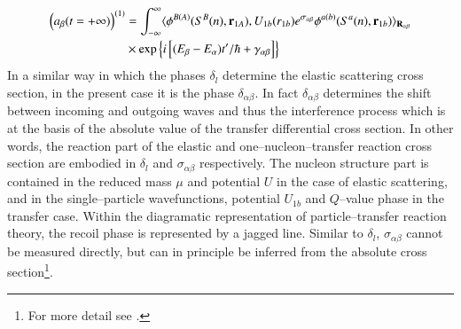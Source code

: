 \begin{subappendices}
 \begin{align}\label{eq1.D.37}
\nonumber \left(a_\beta(t=+\infty)\right)^{(1)}&=\int_{-\infty}^{\infty}\langle {\phi^{B(A)}(S^B(n),\mathbf r_{1A}),U_{1b}(r_{1b})e^{\sigma_{\alpha\beta}}\phi^{a(b)}(S^a(n),\mathbf r_{1b})} \rangle_{\mathbf R_{\alpha\beta}}\\
&\times\exp\left\{i\left[(E_\beta-E_\alpha)t'/\hbar+\gamma_{\alpha\beta}\right]\right\}
 \end{align}
 In a similar way in which the phases $\delta_l$ determine the elastic scattering cross section, in the present case it is the phase $\delta_{\alpha\beta}$. In fact $\delta_{\alpha\beta}$ determines the shift between incoming and outgoing waves and thus the interference process which is at the basis of the absolute value of the transfer differential cross section. In other words, the reaction part of the elastic and one--nucleon--transfer reaction cross section are embodied in $\delta_l$ and $\sigma_{\alpha\beta}$ respectively. The nucleon structure part is contained in the reduced mass $\mu$ and potential $U$ in the case of elastic scattering, and in the single--particle wavefunctions, potential $U_{1b}$ and $Q$--value phase in the transfer case. Within the diagramatic representation of particle--transfer reaction theory, the recoil phase is represented by a jagged line. Similar to $\delta_l$, $\sigma_{\alpha\beta}$ cannot be measured directly, but can in principle  be inferred from the absolute cross section\footnote{For more detail see \cite{Broglia:04a}.}.
 
 
 
 
 
 
 
 
 

\end{subappendices}






























\clearpage
\newpage















 
% 
 